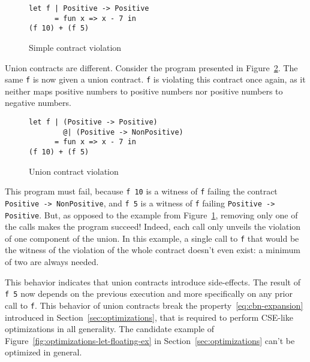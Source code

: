 \documentclass[sigplan,10pt,review,anonymous]{acmart}
\newcommand{\nickel}[1]{\lstinline[language=nickel]{#1}}
\begin{document}
\begin{figure}[h]
\begin{lstlisting}[language=nickel]
let f | Positive -> Positive
      = fun x => x - 7 in
(f 10) + (f 5)
\end{lstlisting}
\caption{Simple contract violation}
\label{fig:pos-to-pos}
\end{figure}

%

Union contracts are different. Consider the program presented in
Figure~\ref{fig:wrong-union-function}. The same \nickel{f} is now given a union
contract. \nickel{f} is violating this contract once again, as it neither maps
positive numbers to positive numbers nor positive numbers to negative numbers.

\begin{figure}[h]
\begin{lstlisting}[language=nickel]
let f | (Positive -> Positive)
        @| (Positive -> NonPositive)
      = fun x => x - 7 in
(f 10) + (f 5)
\end{lstlisting}
\caption{Union contract violation}
\label{fig:wrong-union-function}
\end{figure}

This program must fail, because \nickel{f 10} is a witness of \nickel{f} failing
the contract \nickel{Positive -> NonPositive}, and \nickel{f 5} is a witness of
\nickel{f} failing \nickel{Positive -> Positive}.  But, as opposed to the
example from Figure~\ref{fig:pos-to-pos}, removing only one of the calls makes the
program succeed! Indeed, each call only unveils the violation of one component
of the union. In this example, a single call to \nickel{f} that would be the
witness of the violation of the whole contract doesn't even exist: a minimum of
two are always needed.

This behavior indicates that union contracts introduce side-effects. The result
of \nickel{f 5} now depends on the previous execution and more specifically on
any prior call to \nickel{f}. This behavior of union contracts break the
property~\ref{eq:cbn-expansion} introduced in Section~\ref{sec:optimizations},
that is required to perform CSE-like optimizations in all generality. The
candidate example of Figure~\ref{fig:optimizations-let-floating-ex} in
Section~\ref{sec:optimizations} can't be optimized in general.
\end{document}

